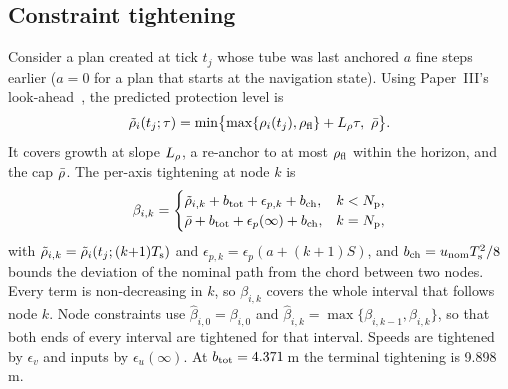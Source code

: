 \subsection{Constraint tightening}\label{sec:tightening}
Consider a plan created at tick $t_j$ whose tube was last anchored $a$ fine
steps earlier ($a=0$ for a plan that starts at the navigation state). Using
Paper~III's look-ahead~\cite{paperIII}, the predicted protection level is
\begin{equation}\label{eq:lookahead}
\tilde\rho_i(t_j;\tau)=\min\bigl\{\max\{\rho_i(t_j),\rhofl\}+\Lrho\tau,\ \rhobar\bigr\}.
\end{equation}
It covers growth at slope $L_{\rho}$, a re-anchor to at most $\rho_{\mathrm{fl}}$ within
the horizon, and the cap $\bar\rho$. The per-axis tightening at node $k$ is
\begin{equation}\label{eq:beta}
\beta_{i,k}=
\begin{cases}
\tilde\rho_{i,k}+b_{\mathrm{tot}}+\epsilon_{p,k}+b_{\mathrm{ch}}, & k<N_{\mathrm{p}},\\
\bar\rho+b_{\mathrm{tot}}+\epsilon_p(\infty)+b_{\mathrm{ch}}, & k=N_{\mathrm{p}},
\end{cases}
\end{equation}
with $\tilde\rho_{i,k}=\tilde\rho_i(t_j;(k{+}1)T_{\mathrm{s}})$ and $\epsilon_{p,k}=\epsilon_p(a+(k{+}1)S)$,
and $b_{\mathrm{ch}}=u_{\mathrm{nom}}T_{\mathrm{s}}^2/8$ bounds the deviation of the nominal path from the
chord between two nodes. Every term is non-decreasing in $k$, so
$\beta_{i,k}$ covers the whole interval that follows node $k$. Node
constraints use $\hat\beta_{i,0}=\beta_{i,0}$ and
$\hat\beta_{i,k}=\max\{\beta_{i,k-1},\beta_{i,k}\}$, so that both ends of
every interval are tightened for that interval. Speeds are tightened by
$\epsilon_v$ and inputs by $\epsilon_u(\infty)$. At $b_{\mathrm{tot}}=4.371$\,m the
terminal tightening is 9.898\,m.

